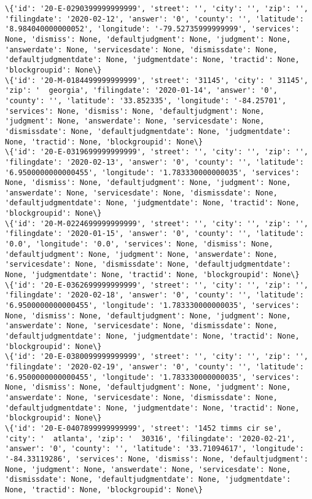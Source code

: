 \documentclass[11pt]{article}
\begin{document}
\begin{Verbatim}[commandchars=\\\{\}]
\{'id': '20-E-0290399999999999', 'street': '', 'city': '', 'zip': '', 'filingdate': '2020-02-12', 'answer': '0', 'county': '', 'latitude': '8.984040000000052', 'longitude': '-79.52735999999999', 'services': None, 'dismiss': None, 'defaultjudgment': None, 'judgment': None, 'answerdate': None, 'servicesdate': None, 'dismissdate': None, 'defaultjudgmentdate': None, 'judgmentdate': None, 'tractid': None, 'blockgroupid': None\}
\{'id': '20-M-0184499999999999', 'street': '31145', 'city': ' 31145', 'zip': '  georgia', 'filingdate': '2020-01-14', 'answer': '0', 'county': '', 'latitude': '33.852335', 'longitude': '-84.25701', 'services': None, 'dismiss': None, 'defaultjudgment': None, 'judgment': None, 'answerdate': None, 'servicesdate': None, 'dismissdate': None, 'defaultjudgmentdate': None, 'judgmentdate': None, 'tractid': None, 'blockgroupid': None\}
\{'id': '20-E-0319699999999999', 'street': '', 'city': '', 'zip': '', 'filingdate': '2020-02-13', 'answer': '0', 'county': '', 'latitude': '6.9500000000000455', 'longitude': '1.783330000000035', 'services': None, 'dismiss': None, 'defaultjudgment': None, 'judgment': None, 'answerdate': None, 'servicesdate': None, 'dismissdate': None, 'defaultjudgmentdate': None, 'judgmentdate': None, 'tractid': None, 'blockgroupid': None\}
\{'id': '20-M-0224699999999999', 'street': '', 'city': '', 'zip': '', 'filingdate': '2020-01-15', 'answer': '0', 'county': '', 'latitude': '0.0', 'longitude': '0.0', 'services': None, 'dismiss': None, 'defaultjudgment': None, 'judgment': None, 'answerdate': None, 'servicesdate': None, 'dismissdate': None, 'defaultjudgmentdate': None, 'judgmentdate': None, 'tractid': None, 'blockgroupid': None\}
\{'id': '20-E-0362699999999999', 'street': '', 'city': '', 'zip': '', 'filingdate': '2020-02-18', 'answer': '0', 'county': '', 'latitude': '6.9500000000000455', 'longitude': '1.783330000000035', 'services': None, 'dismiss': None, 'defaultjudgment': None, 'judgment': None, 'answerdate': None, 'servicesdate': None, 'dismissdate': None, 'defaultjudgmentdate': None, 'judgmentdate': None, 'tractid': None, 'blockgroupid': None\}
\{'id': '20-E-0380099999999999', 'street': '', 'city': '', 'zip': '', 'filingdate': '2020-02-19', 'answer': '0', 'county': '', 'latitude': '6.9500000000000455', 'longitude': '1.783330000000035', 'services': None, 'dismiss': None, 'defaultjudgment': None, 'judgment': None, 'answerdate': None, 'servicesdate': None, 'dismissdate': None, 'defaultjudgmentdate': None, 'judgmentdate': None, 'tractid': None, 'blockgroupid': None\}
\{'id': '20-E-0407899999999999', 'street': '1452 timms cir se', 'city': '  atlanta', 'zip': '  30316', 'filingdate': '2020-02-21', 'answer': '0', 'county': '', 'latitude': '33.71094617', 'longitude': '-84.33119286', 'services': None, 'dismiss': None, 'defaultjudgment': None, 'judgment': None, 'answerdate': None, 'servicesdate': None, 'dismissdate': None, 'defaultjudgmentdate': None, 'judgmentdate': None, 'tractid': None, 'blockgroupid': None\}

\end{Verbatim}
\end{document}
